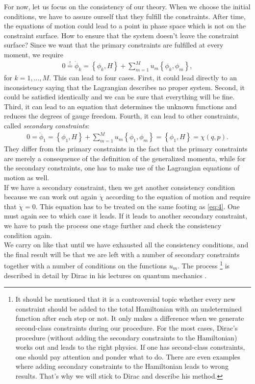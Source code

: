 For now, let us focus on the consistency of our theory. When we choose the initial conditions, we have to assure ourself that they fulfill the constraints. After time, the equations of motion could lead to a point in phase space which is not on the constraint surface. How to ensure that the system doesn't leave the constraint surface?
Since we want that the primary constraints are fulfilled at every moment, we require
\begin{align}\label{eq:4}
0 \overset{!}{=} \dot{\phi}_k = \left \{ \phi_k,H \right \} + \sum_{m=1}^M u_m  \left \{ \phi_k,\phi_m \right \},
\end{align}
for $k=1,...,M$. This can lead to four cases. First, it could lead directly to an inconsistency saying that the Lagrangian describes no proper system. Second, it could be satisfied identically and we can be sure that everything will be fine. Third, it can lead to an equation that determines the unknown functions and reduces the degrees of gauge freedom. Fourth, it can lead to other constraints, called \textit{secondary constraints}:
\begin{align}\label{eq:5}
0 = \dot{\phi}_1 = \left \{ \phi_1,H \right \} + \sum_{m=1}^M u_m  \left \{ \phi_1,\phi_m \right \} = \left \{ \phi_1,H \right \} = \chi(q,p).
\end{align}
They differ from the primary constraints in the fact that the primary constraints are merely a consequence of the definition of the generalized momenta, while for the secondary constraints, one has to make use of the Lagrangian equations of motion as well. \\
If we have a secondary constraint, then we get another consistency condition because we can work out again $\dot{\chi}$ according to the equation of motion and require that $\dot{\chi} = 0$. This equation has to be treated on the same footing as \eqref{eq:4}. One must again see to which case it leads. If it leads to another secondary constraint, we have to push the process one stage further and check the consistency condition again. \\
We carry on like that until we have exhausted all the consistency conditions, and the final result will be that we are left with a number of secondary constraints together with a number of conditions on the functions $u_m$. The process \footnote{It should be mentioned that it is a controversial topic whether every new constraint should be added to the total Hamiltonian with an undetermined function after each step or not. It only makes a difference when we generate second-class constraints during our procedure. For the most cases, Dirac's procedure (without adding the secondary constraints to the Hamiltonian) works out and leads to the right physics. If one has second-class constraints, one should pay attention and ponder what to do. There are even examples where adding secondary constraints to the Hamiltonian leads to wrong results. That's why we will stick to Dirac and describe his method.} is described in detail by Dirac in his lectures on quantum mechanics \cite{1}. \\

